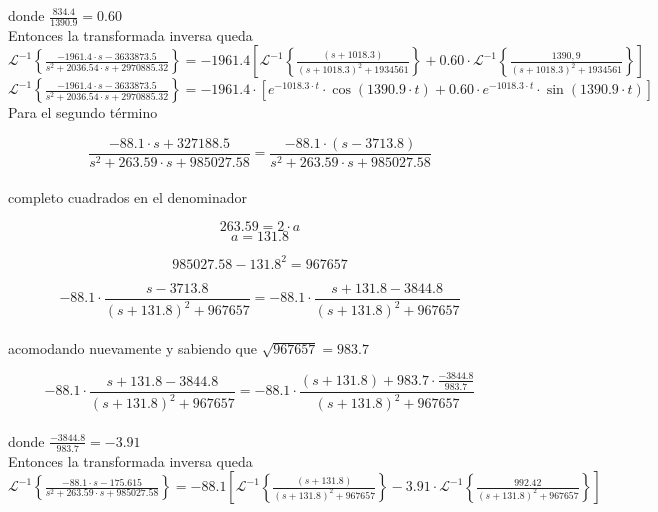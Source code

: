 \documentclass[10pt,a4paper]{article}
\begin{document}
    donde $\frac{834.4}{1390.9} = 0.60$ \\

    Entonces la transformada inversa queda \\

    $\mathscr{L}^{-1}\left\{\frac{-1961.4 \cdot s -3633873.5}{s^{2}+2036.54 \cdot s + 2970885.32}\right\}=-1961.4\left[\mathscr{L}^{-1}\left\{\frac{(s +1018.3)}{{(s+1018.3)^{2}}+1934561}\right\}+0.60 \cdot \mathscr{L}^{-1}\left\{\frac{1390,9}{{(s+1018.3)^{2}}+1934561}\right\}\right] $ \\

    $\mathscr{L}^{-1}\left\{\frac{-1961.4 \cdot s -3633873.5}{s^{2}+2036.54 \cdot s + 2970885.32}\right\}= -1961.4\cdot \left[ e^{-1018.3 \cdot t} \cdot \cos{(1390.9\cdot t)} + 0.60 \cdot e^{-1018.3 \cdot t} \cdot \sin{(1390.9\cdot t)}  \right] $ \\


    Para el segundo término

    \[\frac{-88.1 \cdot s + 327188.5}{s^{2}+263.59 \cdot s + 985027.58} = \frac{-88.1\cdot(s -3713.8)}{s^{2}+263.59 \cdot s + 985027.58}\] \\

    completo cuadrados en el denominador

    \[263.59 = 2\cdot a\]
    \[a = 131.8\]

    \[985027.58-131.8^2 = 967657\]



    \[-88.1\cdot \frac{s -3713.8}{{(s + 131.8)^{2}}+967657} = -88.1\cdot\frac{s +131.8 -3844.8}{{(s+131.8)^{2}}+967657}\] \\

    acomodando nuevamente y sabiendo que $\sqrt{967657} = 983.7$


    \[-88.1\cdot\frac{s +131.8 -3844.8}{{(s+131.8)^{2}}+967657} = -88.1\cdot \frac{(s +131.8) + 983.7\cdot \frac{-3844.8}{983.7}}{{(s+131.8)^{2}}+967657}\] \\

    donde $\frac{-3844.8}{983.7} = -3.91$ \\

    Entonces la transformada inversa queda \\

    $\mathscr{L}^{-1}\left\{\frac{-88.1 \cdot s - 175.615}{s^{2}+263.59 \cdot s + 985027.58}\right\}=-88.1\left[\mathscr{L}^{-1}\left\{\frac{(s +131.8)}{{(s+131.8)^{2}}+967657}\right\}-3.91 \cdot \mathscr{L}^{-1}\left\{\frac{992.42}{{(s+131.8)^{2}}+967657}\right\}\right] $ \\
\end{document}
